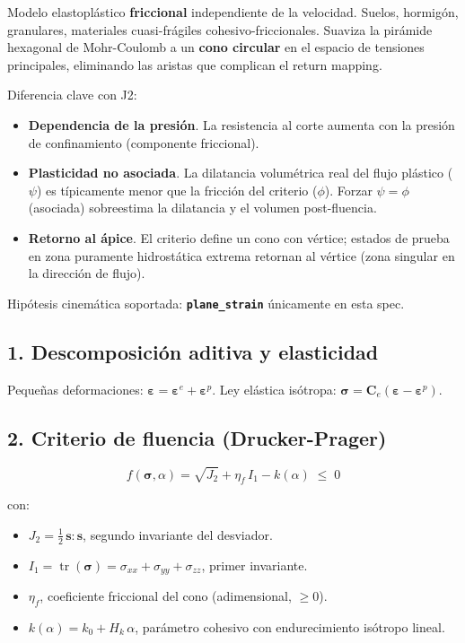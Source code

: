 \documentclass[11pt,letterpaper,oneside]{report}
\begin{document}
Modelo elastoplástico \textbf{friccional} independiente de la velocidad. Suelos, hormigón, granulares, materiales cuasi-frágiles cohesivo-friccionales. Suaviza la pirámide hexagonal de Mohr-Coulomb a un \textbf{cono circular} en el espacio de tensiones principales, eliminando las aristas que complican el return mapping.

Diferencia clave con J2:

\begin{itemize}
  \item \textbf{Dependencia de la presión}. La resistencia al corte aumenta con la presión de confinamiento (componente friccional).
  \item \textbf{Plasticidad no asociada}. La dilatancia volumétrica real del flujo plástico ($\psi$) es típicamente menor que la fricción del criterio ($\phi$). Forzar $\psi = \phi$ (asociada) sobreestima la dilatancia y el volumen post-fluencia.
  \item \textbf{Retorno al ápice}. El criterio define un cono con vértice; estados de prueba en zona puramente hidrostática extrema retornan al vértice (zona singular en la dirección de flujo).
\end{itemize}

Hipótesis cinemática soportada: \textbf{\texttt{plane\_strain}} únicamente en esta spec.

\subsection{1. Descomposición aditiva y elasticidad}

Pequeñas deformaciones: $\boldsymbol\varepsilon = \boldsymbol\varepsilon^e + \boldsymbol\varepsilon^p$. Ley elástica isótropa: $\boldsymbol\sigma = \mathbf C_e (\boldsymbol\varepsilon - \boldsymbol\varepsilon^p)$.

\subsection{2. Criterio de fluencia (Drucker-Prager)}

\[
f(\boldsymbol\sigma, \alpha) = \sqrt{J_2} + \eta_f\,I_1 - k(\alpha) \;\leq\; 0
\]

con:

\begin{itemize}
  \item $J_2 = \tfrac{1}{2}\,\mathbf s : \mathbf s$, segundo invariante del desviador.
  \item $I_1 = \operatorname{tr}(\boldsymbol\sigma) = \sigma_{xx} + \sigma_{yy} + \sigma_{zz}$, primer invariante.
  \item $\eta_f$, coeficiente friccional del cono (adimensional, $\geq 0$).
  \item $k(\alpha) = k_0 + H_k\,\alpha$, parámetro cohesivo con endurecimiento isótropo lineal.
\end{itemize}
\end{document}
